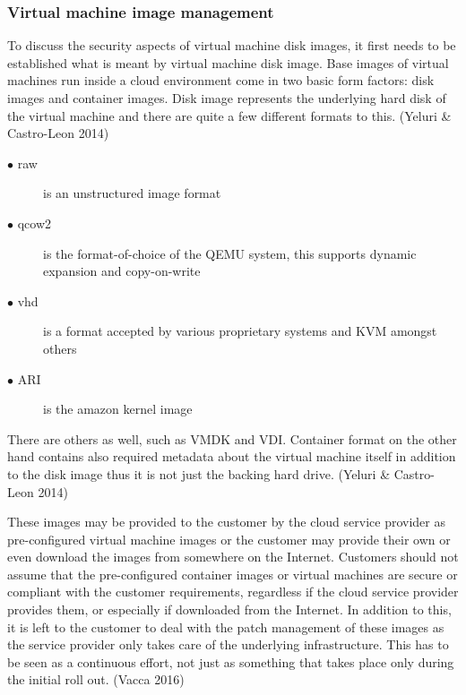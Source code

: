 \documentclass{article}
\begin{document}
\subsubsection{Virtual machine image management}
To discuss the security aspects of virtual machine disk images, it first needs to be established what is meant by virtual machine disk image.
Base images of virtual machines run inside a cloud environment come in two basic form factors: disk images and container images. Disk image represents the underlying hard disk of the virtual machine and there are quite a few different formats to this. (Yeluri \& Castro-Leon 2014)
\begin{description}
	\item[$\bullet$ raw] is an unstructured image format
	\item[$\bullet$ qcow2] is the format-of-choice of the QEMU system, this supports dynamic expansion and copy-on-write
	\item[$\bullet$ vhd] is a format accepted by various proprietary systems and KVM amongst others
	\item[$\bullet$ ARI] is the amazon kernel image
\end{description}
There are others as well, such as VMDK and VDI. Container format on the other hand contains also required metadata about the virtual machine itself in addition to the disk image thus it is not just the backing hard drive. (Yeluri \& Castro-Leon 2014)
\par
These images may be provided to the customer by the cloud service provider as pre-configured virtual machine images or the customer may provide their own or even download the images from somewhere on the Internet. Customers should not assume that the pre-configured container images or virtual machines are secure or compliant with the customer requirements, regardless if the cloud service provider provides them, or especially if downloaded from the Internet. In addition to this, it is left to the customer to deal with the patch management of these images as the service provider only takes care of the underlying infrastructure. This has to be seen as a continuous effort, not just as something that takes place only during the initial roll out. (Vacca 2016)
\end{document}
